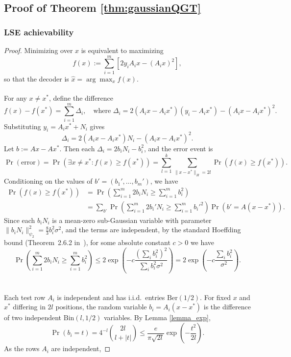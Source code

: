 \documentclass{article}
\begin{document}
\subsection{Proof of Theorem \ref{thm:gaussianQGT}}
\subsubsection{LSE achievability}
\begin{proof}
Minimizing over $x$ is equivalent to maximizing
\[
f(x) := \sum_{i=1}^m [2 y_i A_i x - (A_i x)^2],
\]
so that the decoder is $\widehat{x} = \arg\max_x f(x)$.  
\\\\
For any $x \ne x^*$, define the difference
\[
f(x) - f(x^*) = \sum_{i=1}^m \Delta_i,
\quad
\text{where } \Delta_i = 2(A_i x - A_i x^*)(y_i - A_i x^*) - (A_i x - A_i x^*)^2.
\]
Substituting $y_i = A_i x^* + N_i$ gives
\[
\Delta_i = 2(A_i x - A_i x^*)N_i - (A_i x - A_i x^*)^2.
\]
Let $b := A x - A x^*$.  Then each $\Delta_i = 2 b_i N_i - b_i^2$, and the error event is
\[
\Pr(\text{error})
= \Pr\!\left( \exists x \ne x^* : f(x) \ge f(x^*) \right)
= \sum_{l=1}^k \sum_{\|x-x^*\|_H = 2l} \Pr(f(x)\ge f(x^*)).
\]
Conditioning on the values of $b' = (b_1',\ldots,b_m')$, we have
\begin{align*}
\Pr(f(x)\ge f(x^*))
&= \Pr\!\left(\sum_{i=1}^m 2b_i N_i \ge \sum_{i=1}^m b_i^2 \right)\\
&= \sum_{b'} \Pr\!\left(\sum_{i=1}^m 2b_i' N_i \ge \sum_{i=1}^m b_i'^2\right)
    \Pr(b' = A(x - x^*)).
\end{align*}
Since each $b_i N_i$ is a mean-zero sub-Gaussian variable with parameter $\|b_i N_i\|_{\psi_2}^2 = \frac{8}{3} b_i^2 \sigma^2$, and the terms are independent, by the standard Hoeffding bound (Theorem~2.6.2 in~\cite{vershynin2009high}), for some absolute constant $c>0$ we have
\[
\Pr\!\left(\sum_{i=1}^m 2b_i N_i \ge \sum_{i=1}^m b_i^2 \right)
\le 2\exp\!\left(
   -c \frac{(\sum_i b_i^2)^2}{\sum_i b_i^2\sigma^2}
\right)
= 2\exp\!\left(-c \frac{\sum_i b_i^2}{\sigma^2}\right).
\]
\\\\
Each test row $A_i$ is independent and has i.i.d.\ entries $\mathrm{Ber}(1/2)$.  
For fixed $x$ and $x^*$ differing in $2l$ positions, the random variable $b_i = A_i(x-x^*)$ is the difference of two independent $\mathrm{Bin}(l,1/2)$ variables.  
By Lemma \ref{lemma_exp},
\[
\Pr(b_i = t) = 4^{-l} {2l \choose l + |t|} \le \frac{e}{\pi\sqrt{2l}}\exp\!\left(-\frac{t^2}{2l}\right).
\]
As the rows $A_i$ are independent,

\end{proof}
\end{document}

